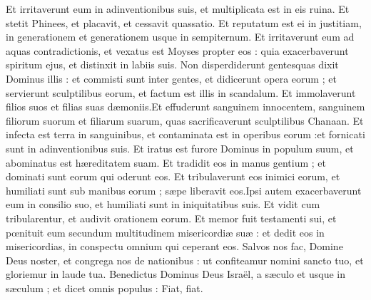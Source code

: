 {\VERSE Et irritaverunt eum in adinventionibus suis, et multiplicata est in eis ruina. \EVERSE
\VERSE Et stetit Phinees,  et placavit, et cessavit quassatio. \EVERSE
\VERSE Et reputatum est ei in justitiam, in generationem et generationem usque in sempiternum. \EVERSE
\VERSE Et irritaverunt eum ad aquas contradictionis, et vexatus est Moyses propter eos : \EVERSE
\VERSE quia exacerbaverunt spiritum ejus, et distinxit in labiis suis. \EVERSE
\VERSE Non disperdiderunt gentesquas dixit Dominus illis : \EVERSE
\VERSE et commisti sunt inter gentes, et didicerunt opera eorum ;  \EVERSE
\VERSE et servierunt sculptilibus eorum, et factum est illis in scandalum. \EVERSE
\VERSE Et immolaverunt filios suos et filias suas dæmoniis.\VERSE Et effuderunt sanguinem innocentem, sanguinem filiorum suorum et filiarum suarum, 
quas sacrificaverunt sculptilibus Chanaan.
Et infecta est terra in sanguinibus,  \EVERSE
\VERSE et contaminata est in operibus eorum :et fornicati sunt in adinventionibus suis. \EVERSE
\VERSE Et iratus est furore Dominus in populum suum, et abominatus est hæreditatem suam. \EVERSE
\VERSE Et tradidit eos in manus gentium ; et dominati sunt eorum qui oderunt eos. \EVERSE
\VERSE Et tribulaverunt eos inimici eorum, et humiliati sunt sub manibus eorum ;  \EVERSE
\VERSE sæpe liberavit eos.Ipsi autem exacerbaverunt eum in consilio suo, 
et humiliati sunt in iniquitatibus suis. \EVERSE
\VERSE Et vidit cum tribularentur, et audivit orationem eorum. \EVERSE
\VERSE Et memor fuit testamenti sui, et pœnituit eum secundum multitudinem misericordiæ suæ : \EVERSE
\VERSE et dedit eos in misericordias, in conspectu omnium qui ceperant eos. \EVERSE
\VERSE Salvos nos fac,  Domine Deus noster, et congrega nos de nationibus :
ut confiteamur nomini sancto tuo, 
et gloriemur in laude tua. \EVERSE
\VERSE Benedictus Dominus Deus Israël,  a sæculo et usque in sæculum ; et dicet omnis populus : Fiat,  fiat.

}
